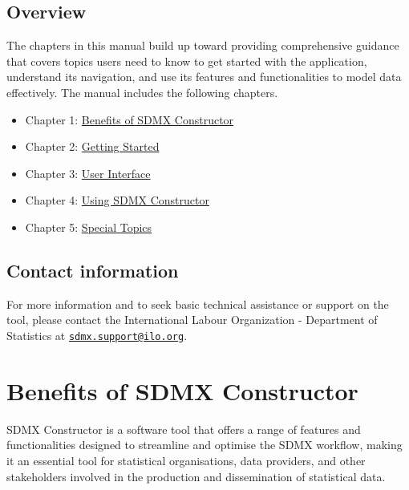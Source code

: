 \documentclass[
]{book}
\providecommand{\tightlist}{%
  \setlength{\itemsep}{0pt}\setlength{\parskip}{0pt}}
\begin{document}
\hypertarget{overview}{%
\section*{Overview}\label{overview}}

The chapters in this manual build up toward providing comprehensive guidance that covers topics users need to know to get started with the application, understand its navigation, and use its features and functionalities to model data effectively. The manual includes the following chapters.

\begin{itemize}
\tightlist
\item
  Chapter 1: \protect\hyperlink{benefits-of}{Benefits of SDMX Constructor}
\item
  Chapter 2: \protect\hyperlink{getting-started}{Getting Started}
\item
  Chapter 3: \protect\hyperlink{user-interface}{User Interface}
\item
  Chapter 4: \protect\hyperlink{using-sdmx}{Using SDMX Constructor}
\item
  Chapter 5: \protect\hyperlink{special-topics}{Special Topics}
\end{itemize}

\hypertarget{contact-information}{%
\section*{Contact information}\label{contact-information}}

For more information and to seek basic technical assistance or support on the tool, please contact the International Labour Organization - Department of Statistics at \href{mailto:sdmx.support@ilo.org}{\nolinkurl{sdmx.support@ilo.org}}.

\hypertarget{benefits-of}{%
\chapter{Benefits of SDMX Constructor}\label{benefits-of}}

SDMX Constructor is a software tool that offers a range of features and functionalities designed to streamline and optimise the SDMX workflow, making it an essential tool for statistical organisations, data providers, and other stakeholders involved in the production and dissemination of statistical data.
\end{document}

